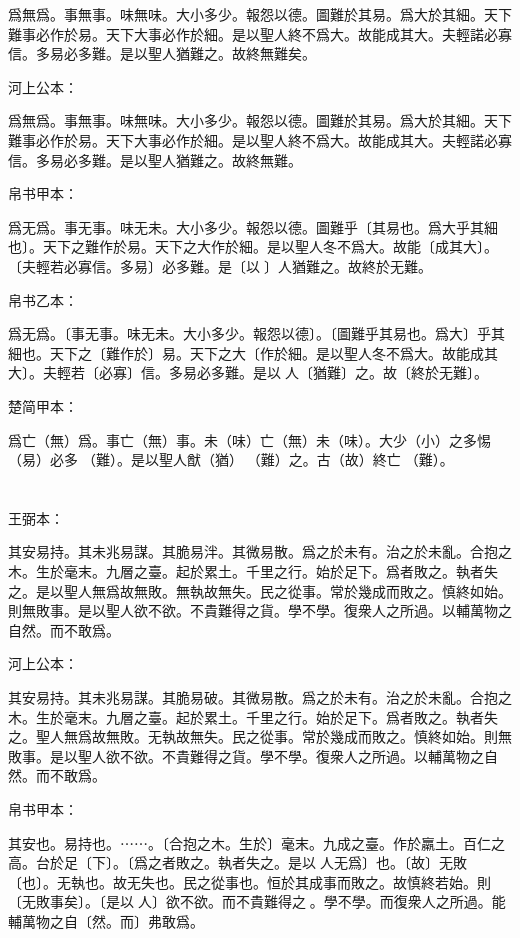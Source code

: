 \documentclass[a5paper]{ctexbook}
\begin{document}
    爲無爲。事無事。味無味。大小多少。報怨以德。圖難於其易。爲大於其細。天下難事必作於易。天下大事必作於細。是以聖人終不爲大。故能成其大。夫輕諾必寡信。多易必多難。是以聖人猶難之。故終無難矣。

    河上公本：

    爲無爲。事無事。味無味。大小多少。報怨以德。圖難於其易。爲大於其細。天下難事必作於易。天下大事必作於細。是以聖人終不爲大。故能成其大。夫輕諾必寡信。多易必多難。是以聖人猶難之。故終無難。

    帛书甲本：

    爲无爲。事无事。味无未。大小多少。報怨以德。圖難乎〔其易也。爲大乎其細也〕。天下之難作於易。天下之大作於細。是以聖人冬不爲大。故能〔成其大〕。〔夫輕若必寡信。多易〕必多難。是〔以𦔻〕人猶難之。故終於无難。

    帛书乙本：

    爲无爲。〔事无事。味无未。大小多少。報怨以德〕。〔圖難乎其易也。爲大〕乎其細也。天下之〔難作於〕易。天下之大〔作於細。是以聖人冬不爲大。故能成其大〕。夫輕若〔必寡〕信。多易必多難。是以𦔻人〔猶難〕之。故〔終於无難〕。

    楚简甲本：

    爲亡（無）爲。事亡（無）事。未（味）亡（無）未（味）。大少（小）之多惕（易）必多󶴱（難）。是以聖人猷（猶）󶴱（難）之。古（故）終亡󶴱（難）。

    \chapter{}
    王弼本：

    其安易持。其未兆易謀。其脆易泮。其微易散。爲之於未有。治之於未亂。合抱之木。生於毫末。九層之臺。起於累土。千里之行。始於足下。爲者敗之。執者失之。是以聖人無爲故無敗。無執故無失。民之從事。常於幾成而敗之。慎終如始。則無敗事。是以聖人欲不欲。不貴難得之貨。學不學。復衆人之所過。以輔萬物之自然。而不敢爲。

    河上公本：

    其安易持。其未兆易謀。其脆易破。其微易散。爲之於未有。治之於未亂。合抱之木。生於毫末。九層之臺。起於累土。千里之行。始於足下。爲者敗之。執者失之。聖人無爲故無敗。无執故無失。民之從事。常於幾成而敗之。慎終如始。則無敗事。是以聖人欲不欲。不貴難得之貨。學不學。復衆人之所過。以輔萬物之自然。而不敢爲。

    帛书甲本：

    其安也。易持也。⋯⋯。〔合抱之木。生於〕毫末。九成之臺。作於羸土。百仁之高。台於足〔下〕。〔爲之者敗之。執者失之。是以𦔻人无爲〕也。〔故〕无敗〔也〕。无執也。故无失也。民之從事也。恒於其成事而敗之。故慎終若始。則〔无敗事矣〕。〔是以𦔻人〕欲不欲。而不貴難得之𦠽。學不學。而復衆人之所過。能輔萬物之自〔然。而〕弗敢爲。
\end{document}

